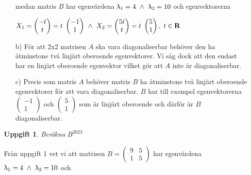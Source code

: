 \documentclass{article}
\newtheorem{thr}{Uppgift}
\begin{document}
\begin{enumerate}
        \vskip 0.1cm

        medan matris $B$ har egenvärdena $\uplambda_{1}=4 \ \wedge \  \uplambda_{2}=10$ och egenvektorerna

        \vskip 0.2cm

        $X_{1}=\begin{pmatrix} -t \\ t \end{pmatrix}=t \; \begin{pmatrix} -1 \\ 1 \end{pmatrix} \ \wedge \  X_{2}=\begin{pmatrix} 5t \\ t \end{pmatrix}=t \; \begin{pmatrix} 5 \\ 1 \end{pmatrix}, \; t \in \mathbf{R}$

        \vskip 1cm

    \item[b)] För att 2x2 matrisen $A$ ska vara diagonaliserbar behöver den ha åtminstone två linjärt oberoende egenvektorer. Vi såg dock att den endast har en linjärt oberoende egenvektor vilket gör att $A$ inte är diagonaliserbar.

        \vskip 0.5cm

    \item[c)] Precis som matris $A$ behöver matris $B$ ha åtminstone två linjärt oberoende egenvektorer för att vara diagonaliserbar. $B$ har till exempel egenvektorerna $\begin{pmatrix} -1 \\ 1 \end{pmatrix}$ och $\begin{pmatrix} 5 \\ 1 \end{pmatrix}$ som är linjärt oberoende och därför är $B$ diagonaliserbar.
\end{enumerate}

\newpage

\begin{thr}
Beräkna $B^{2023}$
\end{thr}

Från uppgift 1 vet vi att matrisen $B=\begin{pmatrix} 9 & 5 \\ 1 & 5 \end{pmatrix}$ har egenvärdena $\uplambda_{1}=4 \ \wedge \  \uplambda_{2}=10$ och
\end{document}
